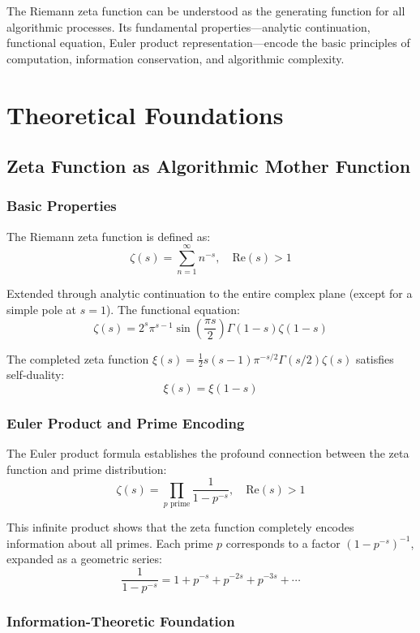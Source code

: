 \documentclass[12pt]{article}
\theoremstyle{plain}
\theoremstyle{definition}
\newcommand{\Re}{\text{Re}}
\begin{document}
The Riemann zeta function can be understood as the generating function for all algorithmic processes. Its fundamental properties—analytic continuation, functional equation, Euler product representation—encode the basic principles of computation, information conservation, and algorithmic complexity.

\section{Theoretical Foundations}

\subsection{Zeta Function as Algorithmic Mother Function}

\subsubsection{Basic Properties}

The Riemann zeta function is defined as:
$$\zeta(s) = \sum_{n=1}^{\infty} n^{-s}, \quad \Re(s) > 1$$

Extended through analytic continuation to the entire complex plane (except for a simple pole at $s=1$). The functional equation:
$$\zeta(s) = 2^s \pi^{s-1} \sin\left(\frac{\pi s}{2}\right) \Gamma(1-s) \zeta(1-s)$$

The completed zeta function $\xi(s) = \frac{1}{2}s(s-1)\pi^{-s/2}\Gamma(s/2)\zeta(s)$ satisfies self-duality:
$$\xi(s) = \xi(1-s)$$

\subsubsection{Euler Product and Prime Encoding}

The Euler product formula establishes the profound connection between the zeta function and prime distribution:
$$\zeta(s) = \prod_{p \text{ prime}} \frac{1}{1 - p^{-s}}, \quad \Re(s) > 1$$

This infinite product shows that the zeta function completely encodes information about all primes. Each prime $p$ corresponds to a factor $(1-p^{-s})^{-1}$, expanded as a geometric series:
$$\frac{1}{1-p^{-s}} = 1 + p^{-s} + p^{-2s} + p^{-3s} + \cdots$$

\subsubsection{Information-Theoretic Foundation}
\end{document}
